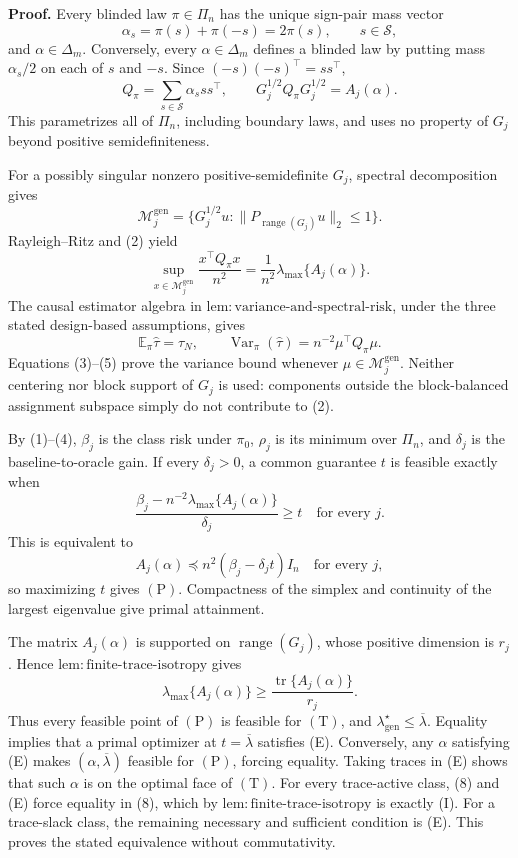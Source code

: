 \textbf{Proof.}
Every blinded law \(\pi\in\Pi_n\) has the unique sign-pair mass vector
\[
\alpha_s=\pi(s)+\pi(-s)=2\pi(s),
\qquad s\in\mathscr S,
\tag{1}
\]
and \(\alpha\in\Delta_m\). Conversely, every \(\alpha\in\Delta_m\) defines a blinded law by putting mass \(\alpha_s/2\) on each of \(s\) and \(-s\). Since \((-s)(-s)^\top=ss^\top\),
\[
Q_\pi=\sum_{s\in\mathscr S}\alpha_sss^\top,
\qquad
G_j^{1/2}Q_\pi G_j^{1/2}=A_j(\alpha).
\tag{2}
\]
This parametrizes all of \(\Pi_n\), including boundary laws, and uses no property of \(G_j\) beyond positive semidefiniteness.

For a possibly singular nonzero positive-semidefinite \(G_j\), spectral decomposition gives
\[
\mathcal M_j^{\mathrm{gen}}
=\{G_j^{1/2}u:\|P_{\operatorname{range}(G_j)}u\|_2\le1\}.
\tag{3}
\]
Rayleigh--Ritz and (2) yield
\[
\sup_{x\in\mathcal M_j^{\mathrm{gen}}}\frac{x^\top Q_\pi x}{n^2}
=\frac1{n^2}\lambda_{\max}\{A_j(\alpha)\}.
\tag{4}
\]
The causal estimator algebra in \(\mathrm{lem:variance\text{-}and\text{-}spectral\text{-}risk}\), under the three stated design-based assumptions, gives
\[
\mathbb E_\pi\widehat\tau=\tau_N,
\qquad
\operatorname{Var}_\pi(\widehat\tau)=n^{-2}\mu^\top Q_\pi\mu.
\tag{5}
\]
Equations (3)--(5) prove the variance bound whenever \(\mu\in\mathcal M_j^{\mathrm{gen}}\). Neither centering nor block support of \(G_j\) is used: components outside the block-balanced assignment subspace simply do not contribute to (2).

By (1)--(4), \(\beta_j\) is the class risk under \(\pi_0\), \(\rho_j\) is its minimum over \(\Pi_n\), and \(\delta_j\) is the baseline-to-oracle gain. If every \(\delta_j>0\), a common guarantee \(t\) is feasible exactly when
\[
\frac{\beta_j-n^{-2}\lambda_{\max}\{A_j(\alpha)\}}{\delta_j}\ge t
\quad\text{for every }j.
\tag{6}
\]
This is equivalent to
\[
A_j(\alpha)\preceq n^2(\beta_j-\delta_jt)I_n
\quad\text{for every }j,
\tag{7}
\]
so maximizing \(t\) gives \((\mathrm P)\). Compactness of the simplex and continuity of the largest eigenvalue give primal attainment.

The matrix \(A_j(\alpha)\) is supported on \(\operatorname{range}(G_j)\), whose positive dimension is \(r_j\). Hence \(\mathrm{lem:finite\text{-}trace\text{-}isotropy}\) gives
\[
\lambda_{\max}\{A_j(\alpha)\}
\ge\frac{\operatorname{tr}\{A_j(\alpha)\}}{r_j}.
\tag{8}
\]
Thus every feasible point of \((\mathrm P)\) is feasible for \((\mathrm T)\), and \(\lambda_{\mathrm{gen}}^\star\le\overline\lambda\). Equality implies that a primal optimizer at \(t=\overline\lambda\) satisfies (E). Conversely, any \(\alpha\) satisfying (E) makes \((\alpha,\overline\lambda)\) feasible for \((\mathrm P)\), forcing equality. Taking traces in (E) shows that such \(\alpha\) is on the optimal face of \((\mathrm T)\). For every trace-active class, (8) and (E) force equality in (8), which by \(\mathrm{lem:finite\text{-}trace\text{-}isotropy}\) is exactly (I). For a trace-slack class, the remaining necessary and sufficient condition is (E). This proves the stated equivalence without commutativity.

